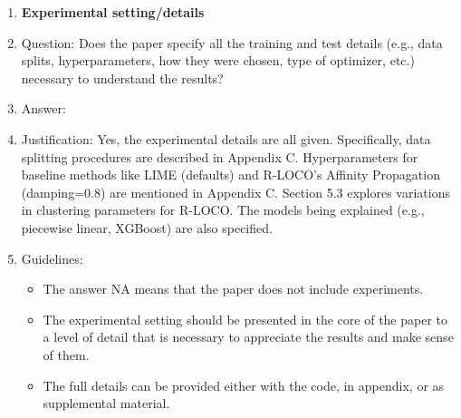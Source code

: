 \documentclass{article}
\theoremstyle{plain}
\theoremstyle{definition}
\theoremstyle{remark}
\begin{document}
\begin{enumerate}
\item {\bf Experimental setting/details}
    \item[] Question: Does the paper specify all the training and test details (e.g., data splits, hyperparameters, how they were chosen, type of optimizer, etc.) necessary to understand the results?
    \item[] Answer: \answerYes{} %
    \item[] Justification: Yes, the experimental details are all given. Specifically, data splitting procedures are described in Appendix C. Hyperparameters for baseline methods like LIME (defaults) and R-LOCO's Affinity Propagation (damping=0.8) are mentioned in Appendix C. Section 5.3 explores variations in clustering parameters for R-LOCO. The models being explained (e.g., piecewise linear, XGBoost) are also specified.
    \item[] Guidelines:
    \begin{itemize}
        \item The answer NA means that the paper does not include experiments.
        \item The experimental setting should be presented in the core of the paper to a level of detail that is necessary to appreciate the results and make sense of them.
        \item The full details can be provided either with the code, in appendix, or as supplemental material.
    \end{itemize}


\end{enumerate}
\end{document}
